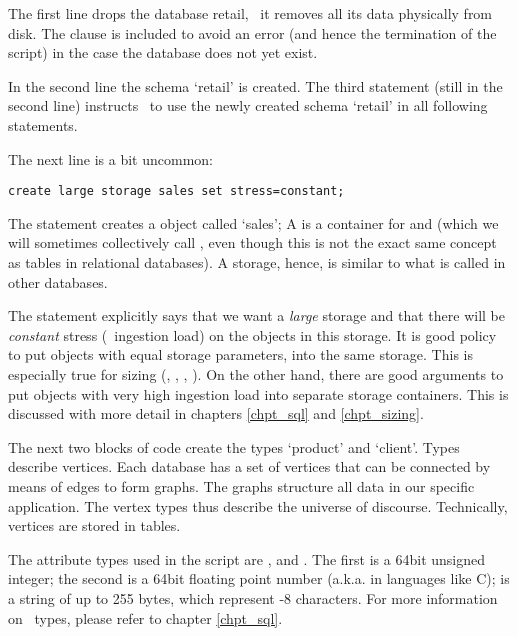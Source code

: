 The first line drops the database retail,
\ie\ it removes all its data physically
from disk. The  clause
is included to avoid an error 
(and hence the termination of the script)
in the case
the database does not yet exist.

In the second line the schema `retail'
is created.
The third statement (still in the second line)
instructs \nowdb\ to use the newly created
schema `retail' in all following statements.

The next line is a bit uncommon:

\begin{sqlcode}
\begin{lstlisting}
create large storage sales set stress=constant;
\end{lstlisting}
\end{sqlcode}

The statement creates a  object called `sales';
A  is a container for 
 and 
(which we will sometimes collectively call ,
even though this is not the exact same concept
as tables in relational databases).
A storage, hence, is similar to what is called
 in other databases.

The statement explicitly says that we
want a \emph{large} storage and that there
will be \emph{constant} stress (\ie\ ingestion load)
on the objects in this storage.
It is good policy to put objects with equal
storage parameters,
into the same storage. This is especially true for sizing
(, , , \etc).
On the other hand, there are good arguments to
put objects with very high ingestion load into
separate storage containers. This is discussed
with more detail in chapters \ref{chpt_sql} and
\ref{chpt_sizing}.

The next two blocks of code create the types
`product' and `client'.
Types describe vertices.
Each database has a set
of vertices that can be connected
by means of edges to form graphs.
The graphs structure all data
in our specific application.
The vertex types thus describe the universe of discourse.
Technically, vertices are stored in
 tables.

The attribute types used in the script
are ,  and .
The first is a 64bit unsigned integer;
the second is a 64bit floating point number
(a.k.a.  in languages like C);
 is a string of up to 255 bytes,
which represent -8 characters.
For more information on \sql\ types,
please refer to chapter
\ref{chpt_sql}.

